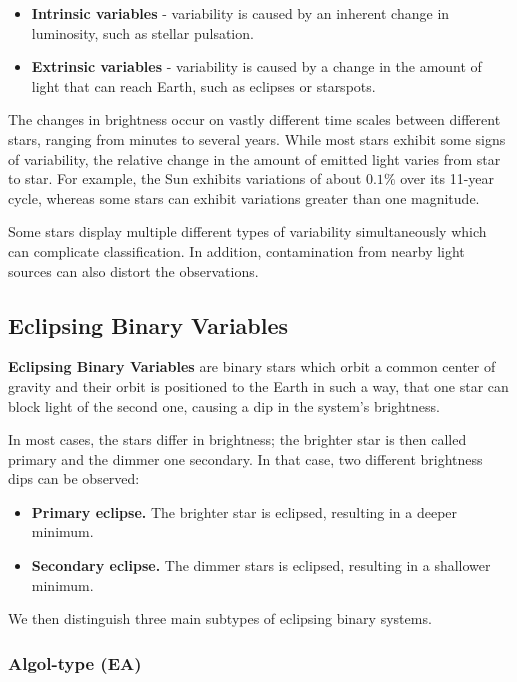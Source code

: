 \begin{itemize}
    \item \textbf{Intrinsic variables} - variability is caused by an inherent change in luminosity, such as stellar pulsation.
    \item \textbf{Extrinsic variables} - variability is caused by a change in the amount of light that can reach Earth, such as eclipses or starspots.
\end{itemize}

The changes in brightness occur on vastly different time scales between different stars, ranging from minutes to several years.
While most stars exhibit some signs of variability, the relative change in the amount of emitted light varies from star to star.
For example, the Sun exhibits variations of about $0.1\%$ over its 11-year cycle, whereas some stars can exhibit variations greater than one magnitude.

Some stars display multiple different types of variability simultaneously which can complicate classification.
In addition, contamination from nearby light sources can also distort the observations. \parencite{Percy2007}

\subsection{Eclipsing Binary Variables}

\textbf{Eclipsing Binary Variables} are binary stars which orbit a common center of gravity and their orbit is positioned to the Earth in such a way, that one star can block light of the second one, causing a dip in the system's brightness. \parencite{Kopal1946}

In most cases, the stars differ in brightness; the brighter star is then called primary and the dimmer one secondary.
In that case, two different brightness dips can be observed:

\begin{itemize}
    \item \textbf{Primary eclipse.} The brighter star is eclipsed, resulting in a deeper minimum.
    \item \textbf{Secondary eclipse.} The dimmer stars is eclipsed, resulting in a shallower minimum.
\end{itemize}

We then distinguish three main subtypes of eclipsing binary systems.

\subsubsection{Algol-type (EA)}

